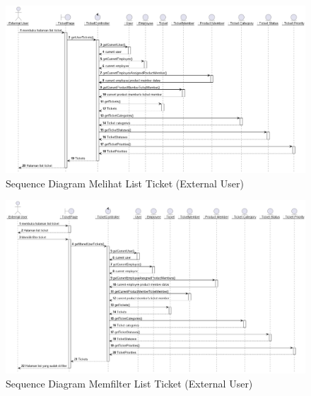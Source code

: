 \documentclass[12pt]{article}
\begin{document}
\begin{enumerate}[label=\textbf{4.\arabic*.}]
\begin{enumerate}[label=\textbf{4.1.\arabic*.}, wide, labelwidth=!, labelindent=0pt]
\begin{enumerate}[label=\textbf{4.1.7.\arabic*.}, wide, labelwidth=!, labelindent=0pt]
\begin{enumerate}[label=\arabic*.]
                \begin{figure}
                    \centering \includegraphics[height=0.575\textheight]{out/plantuml/sequence/ex/ex1/Melihat List Ticket.png}
                    \caption{Sequence Diagram Melihat List Ticket (External User)}
                    \label{fig:SQ-PIC-01}
                \end{figure}

                \begin{figure}
                    \centering \includegraphics[height=0.575\textheight]{out/plantuml/sequence/ex/ex2/Memfilter List Ticket.png}
                    \caption{Sequence Diagram Memfilter List Ticket (External User)}
                    \label{fig:SQ-PIC-02}
                \end{figure}


\end{enumerate}
\end{enumerate}
\end{enumerate}
\end{enumerate}
\end{document}
